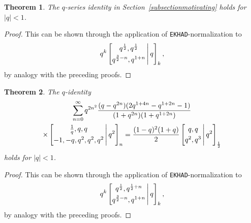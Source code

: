 \documentclass[12pt]{article}
\newtheorem{theorem}{Theorem}
\begin{document}
\begin{theorem}\label{Theoremposquart1}
 The $q$-series identity in Section~\ref{subsectionmotivating} holds for $|q| < 1$. 
\end{theorem}

\begin{proof}
 This can be shown through the application of {\tt EKHAD}-normalization to 
\begin{equation*}
 q^{k} \left[ \begin{matrix} q^{\frac{1}{2}}, q^{\frac{1}{2}} \vspace{1mm} \\ 
 q^{\frac{3}{2} - n}, q^{1+n} \end{matrix} \, \Bigg| \, q \right]_{k}, 
\end{equation*}
 by analogy with the preceding proofs. 
\end{proof}

\begin{theorem}\label{Theoremposquart2}
 The $q$-identity 
\begin{multline*}
 \sum_{n=0}^{\infty} 
 q^{2 n^2} \frac{ (q - q^{2n}) (2q^{1+4n} - q^{1+2n} - 1 ) }{ (1+q^{2n}) (1 + q^{1+2n}) } \\
 \times \left[ \begin{matrix} \frac{1}{q}, q, q \vspace{1mm} \\ 
 -1, -q, q^2, q^2, q^2 \end{matrix} \, \Bigg| \, q^2 \right]_{n} 
 = 
 \frac{(1-q)^2 (1+q) }{2} \left[ \begin{matrix} q, q \vspace{1mm} \\ 
 q^2, q^3 \end{matrix} \, \Bigg| \, q^2 \right]_{\frac{1}{2}}
\end{multline*}
 holds for $|q| < 1$. 
\end{theorem}

\begin{proof}
 This can be shown through the application of {\tt EKHAD}-normalization to 
\begin{equation*}
 q^{k} \left[ \begin{matrix} q^{\frac{1}{2}}, q^{\frac{1}{2}+n} \vspace{1mm} \\ 
 q^{\frac{3}{2} - n}, q^{1+n} \end{matrix} \, \Bigg| \, q \right]_{k}, 
\end{equation*}
 by analogy with the preceding proofs. 
\end{proof}
\end{document}

